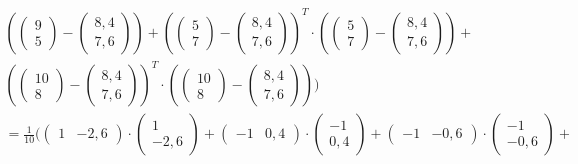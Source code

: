 \documentclass[a4paper,parskip=full-]{article}
\begin{document}
\begin{multline*}
\left( \begin{pmatrix}  9 \\  5 \end{pmatrix} - \begin{pmatrix} 8,4 \\ 7,6 \end{pmatrix} \right) + 
\left( \begin{pmatrix}  5 \\  7 \end{pmatrix} - \begin{pmatrix} 8,4 \\ 7,6 \end{pmatrix} \right)^T \cdot
\left( \begin{pmatrix}  5 \\  7 \end{pmatrix} - \begin{pmatrix} 8,4 \\ 7,6 \end{pmatrix} \right) + \\
\left( \begin{pmatrix} 10 \\  8 \end{pmatrix} - \begin{pmatrix} 8,4 \\ 7,6 \end{pmatrix} \right)^T \cdot
\left( \begin{pmatrix} 10 \\  8 \end{pmatrix} - \begin{pmatrix} 8,4 \\ 7,6 \end{pmatrix} \right) 
\Biggr) \\
= \frac{1}{10} \Biggl(
\begin{pmatrix} 1 &  -2,6 \end{pmatrix} \cdot
\begin{pmatrix} 1 \\ -2,6 \end{pmatrix} +
\begin{pmatrix} -1 &  0,4 \end{pmatrix} \cdot
\begin{pmatrix} -1 \\ 0,4 \end{pmatrix} +
\begin{pmatrix} -1 &  -0,6 \end{pmatrix} \cdot
\begin{pmatrix} -1 \\-0,6 \end{pmatrix} + \\

\end{multline*}
\end{document}
